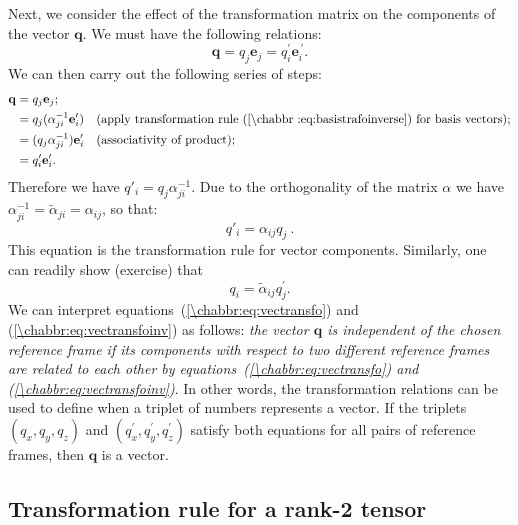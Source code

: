 Next, we consider the effect of the transformation matrix on the components of the vector $\mathbf{q}$.  We must have the following relations:
\begin{equation}
	\mathbf{q}=q_j\mathbf{e}_j=q_i^{\prime}\mathbf{e}_i^{\,\prime}.
\end{equation}
We can then carry out the following series of steps:
\begin{align*}
	\mathbf{q} &= q_j\mathbf{e}_j;\\
	&= q_j (\alpha^{-1}_{ji}\mathbf{e}'_i)\quad\text{(apply transformation rule (\ref{\chabbr:eq:basistrafoinverse}) for basis vectors)};\\
	&= (q_j \alpha^{-1}_{ji})\mathbf{e}'_i\quad\text{(associativity of product)};\\
	&= q'_i\mathbf{e}'_i.
\end{align*}
Therefore we have $q'_i= q_j \alpha^{-1}_{ji}$. Due to the orthogonality of the matrix $\alpha$ we have $\alpha^{-1}_{ji}=\tilde{\alpha}_{ji}=\alpha_{ij}$, so that:
\begin{equation}
	q'_i = \alpha_{ij}q_j\ .\label{\chabbr:eq:vectransfo}
\end{equation}
This equation is the transformation rule for vector components.  Similarly, one can readily show (exercise) that
\begin{equation}
	q_i=\tilde{\alpha}_{ij}q_j^{\prime}.\label{\chabbr:eq:vectransfoinv}
\end{equation}
We can interpret equations~(\ref{\chabbr:eq:vectransfo}) and (\ref{\chabbr:eq:vectransfoinv}) as follows: \textit{the vector $\mathbf{q}$ is independent of the chosen reference frame if its components with respect to two different reference frames are related to each other by equations~(\ref{\chabbr:eq:vectransfo}) and (\ref{\chabbr:eq:vectransfoinv})}.  In other words, the transformation relations can be used to define when a triplet of numbers represents a vector.  If the triplets $(q_x,q_y,q_z)$ and $(q_x^{\prime},q_y^{\prime},q_z^{\prime})$ satisfy both equations for all pairs of reference frames, then $\mathbf{q}$ is a vector.  


\subsection{Transformation rule for a rank-2 tensor}

